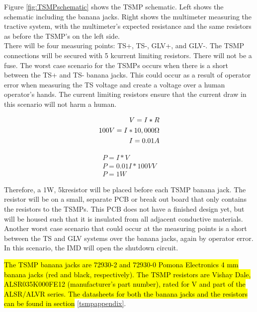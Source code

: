 \documentclass{article}
\DeclareRobustCommand{\hlr}[1]{{\sethlcolor{red}\hl{#1}}}
\begin{document}
            Figure \ref{fig:TSMPschematic} shows the TSMP schematic. Left shows the schematic including the banana jacks. Right shows the multimeter measuring the tractive system, with the multimeter's expected resistance and the same resistors as before the TSMP's on the left side.\\

            There will be four measuring points: TS+, TS-, GLV+, and GLV-. The TSMP connections will be secured with 5 k\ohm current limiting resistors. There will not be a fuse. The worst case scenario for the TSMPs occurs when there is a short between the TS+ and TS- banana jacks. This could occur as a result of operator error when measuring the TS  voltage and create a voltage over a human operator's hands. The current limiting resistors ensure that the current draw in this scenario will not harm a human. 
            
            \begin{align}
                V = I * R \\
                100 V = I * 10,000 \ohm \\
                I = 0.01A
            \end{align}
            
            \begin{align}
                P = I * V \\
                P = 0.01 I * 100V V \\
                P = 1 W
            \end{align}
            
            Therefore, a 1W, 5k\ohm resistor will be placed before each TSMP banana jack. The resistor will be on a small, separate PCB or break out board that only contains the resistors to the TSMPs. This PCB does not have a finished design yet, but will be housed such that it is insulated from all adjacent conductive materials.\\
            
            Another worst case scenario that could occur at the measuring points is a short between the TS and GLV systems over the banana jacks, again by operator error. In this scenario, the IMD will open the shutdown circuit.
            
            \hlr{The TSMP banana jacks are 72930-2 and 72930-0 Pomona Electronics 4 mm banana jacks (red and black, respectively). The TSMP resistors are Vishay Dale, ALSR035K000FE12 (manufacturer's part number), rated for V and part of the ALSR/ALVR series. The datasheets for both the banana jacks and the resistors can be found in section} \ref{tsmpappendix}.
            
\end{document}
